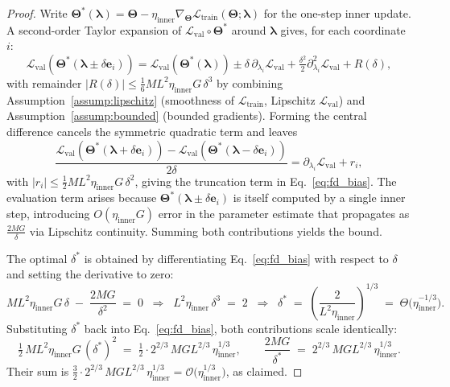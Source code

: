 \documentclass[10pt]{article}
\theoremstyle{plain}
\theoremstyle{definition}
\begin{document}
\begin{proof}
Write $\boldsymbol{\Theta}^{\!*}(\boldsymbol{\lambda}) =
\boldsymbol{\Theta} - \eta_{\mathrm{inner}}
\nabla_{\boldsymbol{\Theta}}\mathcal{L}_{\mathrm{train}}
(\boldsymbol{\Theta};\boldsymbol{\lambda})$ for the one-step inner
update. A second-order Taylor expansion of
$\mathcal{L}_{\mathrm{val}}\!\circ\!\boldsymbol{\Theta}^{\!*}$
around $\boldsymbol{\lambda}$ gives, for each coordinate $i$:
\[
\mathcal{L}_{\mathrm{val}}(\boldsymbol{\Theta}^{\!*}
(\boldsymbol{\lambda}\!\pm\!\delta\mathbf{e}_i))
= \mathcal{L}_{\mathrm{val}}(\boldsymbol{\Theta}^{\!*}
(\boldsymbol{\lambda}))
\pm\delta\,\partial_{\lambda_i}\mathcal{L}_{\mathrm{val}}
+\tfrac{\delta^{2}}{2}\partial_{\lambda_i}^{2}
 \mathcal{L}_{\mathrm{val}} + R(\delta),
\]
with remainder $|R(\delta)|\le \tfrac{1}{6}M L^{2}
\eta_{\mathrm{inner}}G\,\delta^{3}$ by combining
Assumption~\ref{assump:lipschitz} (smoothness of
$\mathcal{L}_{\mathrm{train}}$, Lipschitz
$\mathcal{L}_{\mathrm{val}}$) and Assumption~\ref{assump:bounded}
(bounded gradients). Forming the central difference cancels the
symmetric quadratic term and leaves
\[
\frac{\mathcal{L}_{\mathrm{val}}(\boldsymbol{\Theta}^{\!*}
(\boldsymbol{\lambda}+\delta\mathbf{e}_i))
-\mathcal{L}_{\mathrm{val}}(\boldsymbol{\Theta}^{\!*}
(\boldsymbol{\lambda}-\delta\mathbf{e}_i))}
{2\delta}
= \partial_{\lambda_i}\mathcal{L}_{\mathrm{val}} + r_i,
\]
with $|r_i|\le\tfrac{1}{2}M L^{2}\eta_{\mathrm{inner}}G\,\delta^{2}$,
giving the truncation term in Eq.~\eqref{eq:fd_bias}. The
evaluation term arises because
$\boldsymbol{\Theta}^{\!*}(\boldsymbol{\lambda}\pm\delta\mathbf{e}_i)$
is itself computed by a single inner step, introducing
$O(\eta_{\mathrm{inner}}G)$ error in the parameter estimate that
propagates as $\tfrac{2MG}{\delta}$ via Lipschitz continuity.
Summing both contributions yields the bound.

The optimal $\delta^{\!*}$ is obtained by differentiating
Eq.~\eqref{eq:fd_bias} with respect to $\delta$ and setting the
derivative to zero:
\[
M L^{2}\eta_{\mathrm{inner}}G\,\delta \;-\; \frac{2MG}{\delta^{2}}
\;=\; 0
\;\;\Longrightarrow\;\;
L^{2}\eta_{\mathrm{inner}}\,\delta^{3} \;=\; 2
\;\;\Longrightarrow\;\;
\delta^{\!*} \;=\; \left(\frac{2}{L^{2}\eta_{\mathrm{inner}}}\right)^{\!1/3}
\;=\; \Theta\!\big(\eta_{\mathrm{inner}}^{-1/3}\big).
\]
Substituting $\delta^{\!*}$ back into Eq.~\eqref{eq:fd_bias}, both
contributions scale identically:
\[
\tfrac{1}{2}\,ML^{2}\eta_{\mathrm{inner}}G\,(\delta^{\!*})^{2}
\;=\;
\tfrac{1}{2}\cdot 2^{2/3}\,MGL^{2/3}\,\eta_{\mathrm{inner}}^{1/3},
\qquad
\frac{2MG}{\delta^{\!*}}
\;=\;
2^{2/3}\,MGL^{2/3}\,\eta_{\mathrm{inner}}^{1/3}.
\]
Their sum is
$\tfrac{3}{2}\!\cdot\!2^{2/3}\,MGL^{2/3}\,\eta_{\mathrm{inner}}^{1/3}
=\mathcal{O}\!\big(\eta_{\mathrm{inner}}^{1/3}\big)$, as claimed.
\end{proof}
\end{document}
